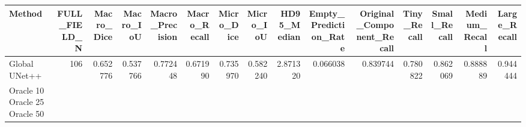 \begin{tabular}{lrrrrrrrrrrrrrr}
\toprule
Method & FULL_FIELD_N & Macro_Dice & Macro_IoU & Macro_Precision & Macro_Recall & Micro_Dice & Micro_IoU & HD95_Median & Empty_Prediction_Rate & Original_Component_Recall & Tiny_Recall & Small_Recall & Medium_Recall & Large_Recall \\
\midrule
Global UNet++ & 106 & 0.652776 & 0.537766 & 0.772448 & 0.671990 & 0.735970 & 0.582240 & 2.871320 & 0.066038 & 0.839744 & 0.780822 & 0.862069 & 0.888889 & 0.944444 \\
Oracle 10%
Oracle 25%
Oracle 50%
\bottomrule
\end{tabular}
